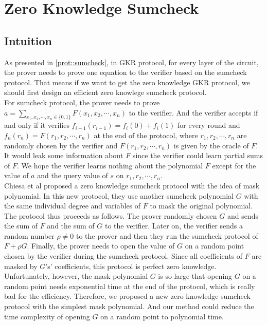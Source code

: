 

\section{Zero Knowledge Sumcheck}\label{ZKSumcheck}
\subsection{Intuition}
As presented in \ref{prot::sumcheck}, in GKR protocol\cite{GKR}, for every layer of the circuit, the prover needs to prove one equation to the verifier based on the sumcheck protocol. That means if we want to get the zero knowledge GKR protocol, we should first design an efficient zero knowlege sumcheck protocol.\\

For sumcheck protocol, the prover needs to prove $a = \sum\limits_{x_1, x_2, \cdots, x_n \in \{0, 1\}}F(x_1, x_2, \cdots, x_n)$ to the verifier. And the verifier accepts if and only if it verifies $f_{i-1}(r_{i-1}) = f_i(0) + f_i(1)$ for every round and $f_n(r_n) = F(r_1, r_2, \cdots, r_n)$ at the end of the protocol, where $r_1, r_2, \cdots, r_n$ are randomly chosen by the verifier and $F(r_1, r_2, \cdots, r_n)$ is given by the oracle of $F$. It would leak some information about $F$ since the verifier could learn partial sums of $F$. We hope the verifier learns nothing about the polynomial $F$ except for the value of $a$ and the query value of $s$ on $r_1, r_2, \cdots, r_n$.\\

Chiesa et al\cite{zksumcheck} proposed a zero knowledge sumcheck protocol with the idea of mask polynomial. In this new protocol, they use another sumcheck polynomial $G$ with the same individual degree and variables of $F$ to mask the original polynomial. The protocol thus proceeds as follows. The prover randomly chosen $G$ and sends the sum of $F$ and the sum of $G$ to the verifier. Later on, the verifier sends a random number $\rho \neq 0$ to the prover and then they run the sumcheck protocol of $F + \rho G$. Finally, the prover needs to open the value of $G$ on a random point chosen by the verifier during the sumcheck protocol. Since all coefficients of $F$ are masked by $G$'s' coefficients, this protocol is perfect zero knowledge.\\

Unfortunately, however, the mask polynomial $G$ is so large that opening $G$ on a random point needs exponential time at the end of the protocol, which is really bad for the efficiency. Therefore, we proposed a new zero knowledge sumcheck protocol with the simplest mask polynomial. And our method could reduce the time complexity of opening $G$ on a random point to polynomial time.\\

